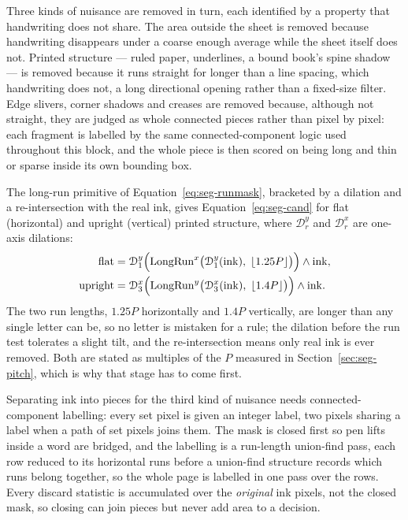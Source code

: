 Three kinds of nuisance are removed in turn, each identified by a property that handwriting does not share. The area outside the sheet is removed because handwriting disappears under a coarse enough average while the sheet itself does not. Printed structure --- ruled paper, underlines, a bound book's spine shadow --- is removed because it runs straight for longer than a line spacing, which handwriting does not, a long directional opening rather than a fixed-size filter. Edge slivers, corner shadows and creases are removed because, although not straight, they are judged as whole connected pieces rather than pixel by pixel: each fragment is labelled by the same connected-component logic used throughout this block, and the whole piece is then scored on being long and thin or sparse inside its own bounding box.

The long-run primitive of Equation~\ref{eq:seg-runmask}, bracketed by a dilation and a re-intersection with the real ink, gives Equation~\ref{eq:seg-cand} for flat (horizontal) and upright (vertical) printed structure, where $\mathcal D_r^{y}$ and $\mathcal D_r^{x}$ are one-axis dilations:
\begin{equation}
\begin{aligned}
\mathrm{flat}&=\mathcal D_{1}^{y}\Bigl(\mathrm{LongRun}^{x}\bigl(\mathcal D_{1}^{y}(\mathrm{ink}),\;\lfloor1.25P\rfloor\bigr)\Bigr)\wedge\mathrm{ink},\\
\mathrm{upright}&=\mathcal D_{3}^{x}\Bigl(\mathrm{LongRun}^{y}\bigl(\mathcal D_{3}^{x}(\mathrm{ink}),\;\lfloor1.4P\rfloor\bigr)\Bigr)\wedge\mathrm{ink}.
\end{aligned}
\label{eq:seg-cand}
\end{equation}
The two run lengths, $1.25P$ horizontally and $1.4P$ vertically, are longer than any single letter can be, so no letter is mistaken for a rule; the dilation before the run test tolerates a slight tilt, and the re-intersection means only real ink is ever removed. Both are stated as multiples of the $P$ measured in Section~\ref{sec:seg-pitch}, which is why that stage has to come first.

Separating ink into pieces for the third kind of nuisance needs connected-component labelling: every set pixel is given an integer label, two pixels sharing a label when a path of set pixels joins them. The mask is closed first so pen lifts inside a word are bridged, and the labelling is a run-length union-find pass, each row reduced to its horizontal runs before a union-find structure records which runs belong together, so the whole page is labelled in one pass over the rows. Every discard statistic is accumulated over the \emph{original} ink pixels, not the closed mask, so closing can join pieces but never add area to a decision.

